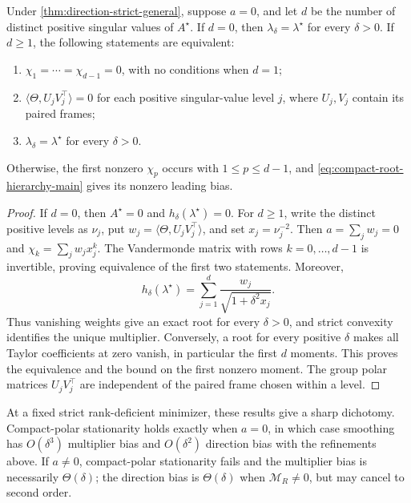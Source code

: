 \begin{corollary}
\label{cor:finite-cancellation-main}
Under \cref{thm:direction-strict-general}, suppose \(a=0\), and let
\(d\) be the number of distinct positive singular values of \(A^\star\).
If \(d=0\), then \(\lambda_\delta=\lambda^\star\) for every \(\delta>0\).
If \(d\ge1\), the following statements are equivalent:
\begin{enumerate}
 \item \(\chi_1=\cdots=\chi_{d-1}=0\), with no conditions when \(d=1\);
 \item \(\langle\Theta,U_jV_j^\top\rangle=0\) for each positive
 singular-value level \(j\), where \(U_j,V_j\) contain its paired frames;
 \item \(\lambda_\delta=\lambda^\star\) for every \(\delta>0\).
\end{enumerate}
Otherwise, the first nonzero \(\chi_p\) occurs with \(1\le p\le d-1\),
and \eqref{eq:compact-root-hierarchy-main} gives its nonzero leading bias.
\end{corollary}

\begin{proof}
If \(d=0\), then \(A^\star=0\) and \(h_\delta(\lambda^\star)=0\).
For \(d\ge1\), write the distinct positive levels as \(\nu_j\), put
\(w_j=\langle\Theta,U_jV_j^\top\rangle\), and set \(x_j=\nu_j^{-2}\).
Then \(a=\sum_jw_j=0\) and \(\chi_k=\sum_jw_jx_j^k\).  The Vandermonde
matrix with rows \(k=0,\ldots,d-1\) is invertible, proving equivalence of
the first two statements.  Moreover,
\[
 h_\delta(\lambda^\star)
 =\sum_{j=1}^d\frac{w_j}{\sqrt{1+\delta^2x_j}}.
\]
Thus vanishing weights give an exact root for every \(\delta>0\), and
strict convexity identifies the unique multiplier.  Conversely, a root
for every positive \(\delta\) makes all Taylor coefficients at zero
vanish, in particular the first \(d\) moments.  This proves the equivalence
and the bound on the first nonzero moment.  The group polar matrices
\(U_jV_j^\top\) are independent of the paired frame chosen within a level.
\end{proof}

At a fixed strict rank-deficient minimizer, these results give a sharp
dichotomy.  Compact-polar stationarity holds exactly when \(a=0\), in which
case smoothing has \(O(\delta^3)\) multiplier bias and \(O(\delta^2)\)
direction bias with
the refinements above.  If \(a\ne0\), compact-polar stationarity fails and the
multiplier bias is necessarily \(\Theta(\delta)\); the direction bias is
\(\Theta(\delta)\) when \(\mathcal M_R\ne0\), but may cancel to second order.

